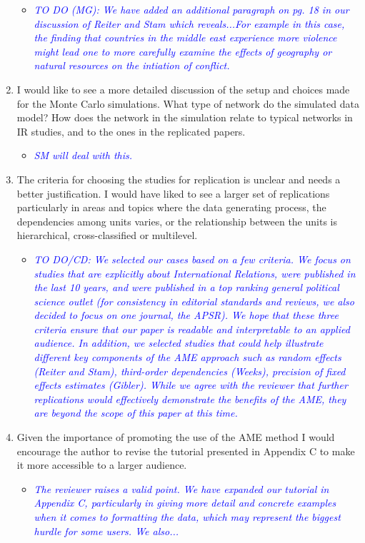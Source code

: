 \begin{enumerate}
	\begin{itemize}
		\item \textcolor{blue}{ \emph{
		TO DO (MG): We have added an additional paragraph on pg. 18 in our discussion of Reiter and Stam which reveals...For example in this case, the finding that countries in the middle east experience more violence might lead one to more carefully examine the effects of geography or natural resources on the intiation of conflict.
		}}
	\end{itemize}
	\item I would like to see a more detailed discussion of the setup and choices made for the Monte Carlo simulations. What type of network do the simulated data model? How does the network in the simulation relate to typical networks in IR studies, and to the ones in the replicated papers.
	\begin{itemize}
		\item \textcolor{blue}{ \emph{
		SM will deal with this.
		}}
	\end{itemize}
	\item The criteria for choosing the studies for replication is unclear and needs a better justification. I would have liked to see a larger set of replications particularly in areas and topics where the data generating process, the dependencies among units varies, or the relationship between the units is hierarchical, cross-classified or multilevel.
	\begin{itemize}
		\item \textcolor{blue}{ \emph{
		TO DO/CD: We selected our cases based on a few criteria. We focus on studies that are explicitly about International Relations, were published in the last 10 years, and were published in a top ranking general political science outlet (for consistency in editorial standards and reviews, we also decided to focus on one journal, the APSR). We hope that these three criteria ensure that our paper is readable and interpretable to an applied audience. In addition, we selected studies that could help illustrate different key components of the AME approach such as random effects (Reiter and Stam), third-order dependencies (Weeks), precision of fixed effects estimates (Gibler).  While we agree with the reviewer that further replications would effectively demonstrate the benefits of the AME, they are beyond the scope of this paper at this time.
		}}
	\end{itemize}
	\item Given the importance of promoting the use of the AME method I would encourage the author to revise the tutorial presented in Appendix C to make it more accessible to a larger audience.
	\begin{itemize}
		\item \textcolor{blue}{ \emph{
		The reviewer raises a valid point. We have expanded our tutorial in Appendix C, particularly in giving more detail and concrete examples when it comes to formatting the data, which may represent the biggest hurdle for some users. We also...
		}}
	\end{itemize}
\end{enumerate}
